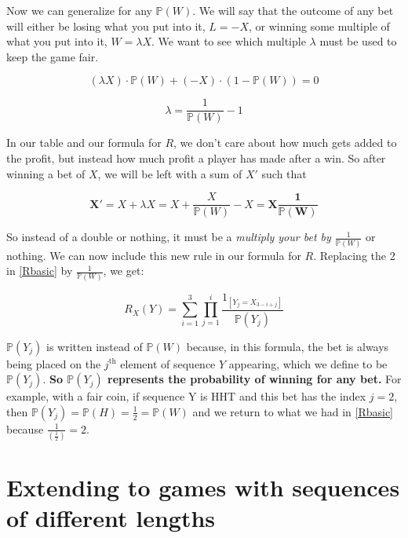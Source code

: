 \documentclass[english,12pt,a4paper,final]{article}
\begin{document}
Now we can generalize for any $\mathbb{P}(W)$. We will say that the outcome of any bet will either be losing what you put into it, $L=-X$, or winning some multiple of what you put into it, $W=\lambda X$. We want to see which multiple $\lambda$ must be used to keep the game fair.

\begin{equation*}
	(\lambda X) \cdot \mathbb{P}(W) + (-X) \cdot (1-\mathbb{P}(W)) = 0
\end{equation*}

\begin{equation*}
	\lambda = \frac{1}{\mathbb{P}(W)} - 1
\end{equation*}

In our table and our formula for $R$, we don't care about how much gets added to the profit, but instead how much profit a player has made after a win. So after winning a bet of $X$, we will be left with a sum of $X'$ such that

\begin{equation*}
	\mathbf{X'} = X + \lambda X = X + \frac{X}{\mathbb{P}(W)} - X = \mathbf{X\frac{1}{\mathbb{P}(W)}}
\end{equation*}

So instead of a double or nothing, it must be a \textit{multiply your bet by $\frac{1}{\mathbb{P}(W)}$} or nothing. We can now include this new rule in our formula for $R$. Replacing the 2 in \eqref{Rbasic} by $\frac{1}{\mathbb{P}(W)}$, we get:

\begin{equation}\label{RanyRandom}
	R_X(Y) = \sum_{i=1}^{3} \prod_{j=1}^{i} \frac{1_{[Y_j = X_{3-i+j}]}}{\mathbb{P}(Y_j)}
\end{equation}

$\mathbb{P}(Y_j)$ is written instead of $\mathbb{P}(W)$ because, in this formula, the bet is always being placed on the $j^{\text{th}}$ element of sequence $Y$ appearing, which we define to be $\mathbb{P}(Y_j)$. \textbf{So $\mathbb{P}(Y_j)$ represents the probability of winning for any bet.} For example, with a fair coin, if sequence Y is HHT and this bet has the index $j=2$, then $\mathbb{P}(Y_j) = \mathbb{P}(H) = \frac{1}{2} = \mathbb{P}(W)$ and we return to what we had in \eqref{Rbasic} because $\frac{1}{(\frac{1}{2})} = 2$.

\section{Extending to games with sequences of different lengths}
\end{document}

